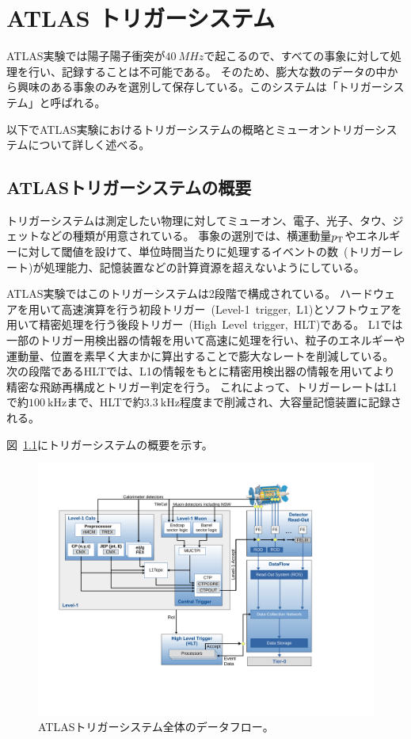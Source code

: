 \chapter{ATLAS トリガーシステム}\label{chapter3}
ATLAS実験では陽子陽子衝突が$\SI{40}{MHz}$で起こるので、すべての事象に対して処理を行い、記録することは不可能である。
そのため、膨大な数のデータの中から興味のある事象のみを選別して保存している。このシステムは「トリガーシステム」と呼ばれる。

以下でATLAS実験におけるトリガーシステムの概略とミューオントリガーシステムについて詳しく述べる。

\section{ATLASトリガーシステムの概要}\label{chapter3-1}
トリガーシステムは測定したい物理に対してミューオン、電子、光子、タウ、ジェットなどの種類が用意されている。
事象の選別では、横運動量$p_\mathrm{T}$やエネルギーに対して閾値を設けて、単位時間当たりに処理するイベントの数~(トリガーレート)が処理能力、記憶装置などの計算資源を超えないようにしている。

ATLAS実験ではこのトリガーシステムは2段階で構成されている。
ハードウェアを用いて高速演算を行う初段トリガー~(Level-1~trigger,~L1)とソフトウェアを用いて精密処理を行う後段トリガー~(High~Level~trigger,~HLT)である。
L1では一部のトリガー用検出器の情報を用いて高速に処理を行い、粒子のエネルギーや運動量、位置を素早く大まかに算出することで膨大なレートを削減している。
次の段階であるHLTでは、L1の情報をもとに精密用検出器の情報を用いてより精密な飛跡再構成とトリガー判定を行う。
これによって、トリガーレートはL1で約$\SI{100}{\kHz}$まで、HLTで約$\SI{3.3}{\kHz}$程度まで削減され、大容量記憶装置に記録される。

図~\ref{fig:3-1}にトリガーシステムの概要を示す。

\begin{figure}[H]
  \centering
  \includegraphics[clip, width=14cm]{fig/3/tdaq-run3-schematic.pdf}
  \caption{ATLASトリガーシステム全体のデータフロー\cite{article:approvedPlotsDAQ}。}
  \label{fig:3-1}
\end{figure}

